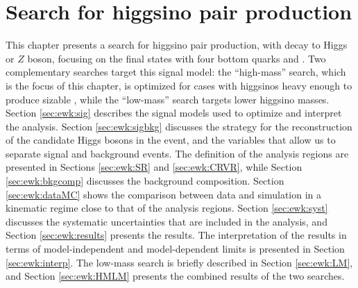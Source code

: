 \chapter{Search for higgsino pair production}
\label{chap:ewk_prod}

This chapter presents a search for higgsino pair production, with decay to Higgs or $Z$ boson, 
focusing on the final states with four bottom quarks and \met. 
Two complementary searches target this signal model: the ``high-mass'' search,
which is the focus of this chapter, is optimized for 
cases with higgsinos heavy enough to produce sizable \met, while the ``low-mass'' search 
targets lower higgsino masses.
Section \ref{sec:ewk:sig} describes the signal models used to optimize and interpret the analysis. 
Section \ref{sec:ewk:sigbkg} discusses the strategy for the reconstruction of the candidate Higgs bosons in the event, 
and the variables that allow us to separate signal and background events. 
The definition of the analysis regions are presented in Sections \ref{sec:ewk:SR} and 
\ref{sec:ewk:CRVR}, 
while Section \ref{sec:ewk:bkgcomp} discusses the background composition. 
Section \ref{sec:ewk:dataMC} shows the comparison between data and simulation in a kinematic regime close to that of the analysis regions. 
Section \ref{sec:ewk:syst} discusses the systematic uncertainties that are included in the analysis, and Section \ref{sec:ewk:results} 
presents the results. 
The interpretation of the results in terms of model-independent and model-dependent limits is presented in Section \ref{sec:ewk:interp}. 
The low-mass search is briefly described in Section \ref{sec:ewk:LM}, and Section \ref{sec:ewk:HMLM}  
presents the combined results of the two searches. 










\clearpage 


